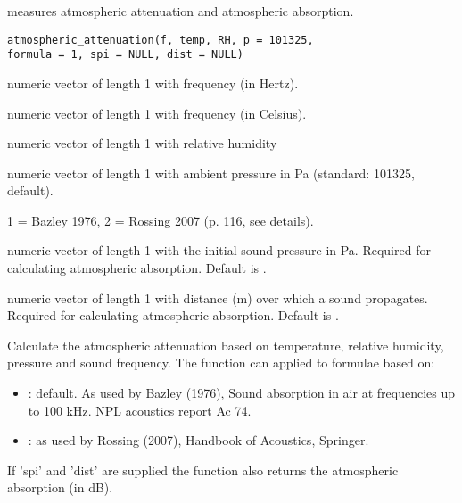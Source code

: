 \documentclass[letterpaper]{book}
\begin{document}
%
\begin{Description}\relax
{} measures atmospheric attenuation and atmospheric absorption.
\end{Description}
%
\begin{Usage}
\begin{verbatim}
atmospheric_attenuation(f, temp, RH, p = 101325, 
formula = 1, spi = NULL, dist = NULL)
\end{verbatim}
\end{Usage}
%
\begin{Arguments}
\begin{ldescription}
\item[\code{f}] numeric vector of length 1 with frequency (in Hertz).

\item[\code{temp}] numeric vector of length 1 with frequency (in Celsius).

\item[\code{RH}] numeric vector of length 1 with relative humidity

\item[\code{p}] numeric vector of length 1 with ambient pressure in Pa (standard: 101325, default).

\item[\code{formula}] 1 = Bazley 1976, 2 = Rossing 2007 (p. 116, see details).

\item[\code{spi}] numeric vector of length 1 with the initial sound pressure in Pa. Required for calculating atmospheric absorption. Default is .

\item[\code{dist}] numeric vector of length 1 with distance (m) over which a sound propagates. Required for calculating atmospheric absorption. Default is .
\end{ldescription}
\end{Arguments}
%
\begin{Details}\relax
Calculate the atmospheric attenuation based on temperature, relative humidity, pressure and sound frequency. The function can applied to formulae based on:
\begin{itemize}

\item{} : default. As used by Bazley (1976), Sound absorption in air at frequencies up to 100 kHz. NPL acoustics report Ac 74. 
\item{} : as used by Rossing (2007), Handbook of Acoustics, Springer.

\end{itemize}

If 'spi' and 'dist' are supplied the function also returns the atmospheric absorption (in dB).
\end{Details}
\end{document}
